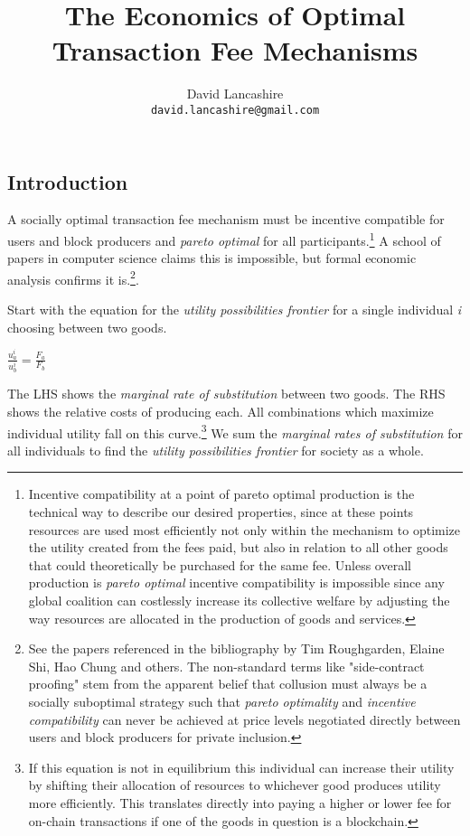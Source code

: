 \documentclass[oneside]{article}   	%
\title{The Economics of Optimal Transaction Fee Mechanisms}
\author{
  David Lancashire\\
  \texttt{david.lancashire@gmail.com}\\
}
\begin{document}
\maketitle


\subsection*{Introduction}

A socially optimal transaction fee mechanism must be incentive compatible for users and block producers and \textit{pareto optimal} for all participants.\footnote{Incentive compatibility at a point of pareto optimal production is the technical way to describe our desired properties, since at these points resources are used most efficiently not only within the mechanism to optimize the utility created from the fees paid, but also in relation to all other goods that could theoretically be purchased for the same fee. Unless overall production is \textit{pareto optimal} incentive compatibility is impossible since any global coalition can costlessly increase its collective welfare by adjusting the way resources are allocated in the production of goods and services.} A school of papers in computer science claims this is impossible, but formal economic analysis confirms it is.\footnote{See the papers referenced in the bibliography by Tim Roughgarden, Elaine Shi, Hao Chung and others. The non-standard terms like "side-contract proofing" stem from the apparent belief that collusion must always be a socially suboptimal strategy such that \textit{pareto optimality} and \textit{incentive compatibility} can never be achieved at price levels negotiated directly between users and block producers for private inclusion.}.

Start with the equation for the \textit{utility possibilities frontier} for a single individual \textit{i} choosing between two goods.

\LARGE
\begin{adjustwidth}{1.5em}{1.5em} 
\begin{math}
\frac{u_a^i}{u_b^i} = \frac{F_a}{F_b}
\end{math}
\end{adjustwidth}
\normalsize

The LHS shows the \textit{marginal rate of substitution} between two goods. The RHS shows the relative costs of producing each. All combinations which maximize individual utility fall on this curve.\footnote{If this equation is not in equilibrium this individual can increase their utility by shifting their allocation of resources to whichever good produces utility more efficiently. This translates directly into paying a higher or lower fee for on-chain transactions if one of the goods in question is a blockchain.} We sum the \textit{marginal rates of substitution} for all individuals to find the \textit{utility possibilities frontier} for society as a whole.
\end{document}
